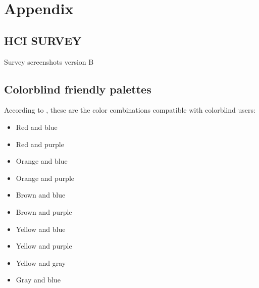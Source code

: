 \documentclass{article}
\begin{document}
\pagebreak
\section{Appendix\label{appendix}}
\subsection{HCI SURVEY\label{survey}}

Survey screenshots version B

\subsection{Colorblind friendly palettes\label{colors}}

According to \textcite{Hobbins2018}, these are the color combinations compatible with colorblind users:

\begin{itemize}
\item Red and blue
\item Red and purple
\item Orange and blue
\item Orange and purple
\item Brown and blue
\item Brown and purple
\item Yellow and blue
\item Yellow and purple
\item Yellow and gray
\item Gray and blue
\end{itemize}
\end{document}
